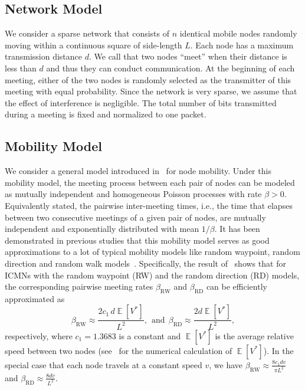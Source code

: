 \documentclass[twocolumn, 10pt]{svjour3}         \smartqed  \usepackage{graphicx}
\DeclareMathOperator*{\E}{\mathbb{E}}
\begin{document}
\subsection{Network Model}

We consider a  sparse network that consists of $n$ identical mobile nodes randomly moving within a continuous square of side-length $L$.
Each node has a maximum transmission distance $d$.
We call that two nodes ``meet'' when their distance is less than $d$ and thus they can conduct communication.
At the beginning of each meeting, either of the two nodes is randomly selected  as the transmitter of this meeting with equal probability.
Since the network is very sparse, we assume that the effect of interference is negligible.
The total number of bits transmitted during a meeting is fixed and normalized to one packet.

\subsection{Mobility Model}

We consider a general  model introduced in~\cite{Groenevelt2005} for node mobility.
Under this mobility model, the meeting process between each pair of nodes can be modeled as mutually independent and  homogeneous Poisson processes with rate $\beta > 0$.
Equivalently stated, the pairwise inter-meeting times, i.e., the time that elapses between two consecutive meetings of a given pair of nodes,  are mutually independent and exponentially distributed with  mean $1/\beta$.
It has been demonstrated in previous studies that this mobility model serves as good approximations to  a lot of typical mobility models like random waypoint, random direction and random walk models~\cite{Groenevelt2005,AlHanbali2008,Zhang2007}.
Specifically, the result of~\cite{Groenevelt2005} shows that for ICMNs with the  random waypoint  (RW) and the random direction (RD) models, the corresponding pairwise meeting rates $\beta_\text{RW}$ and $\beta_\text{RD}$ can be efficiently approximated as
\begin{equation}\label{eqn:beta_estimate}
	\beta_{\text{RW}} \approx \frac{ 2 c_1 \, d \E[V^*]}{L^2},~~\mbox{and}~~
	\beta_\text{RD} \approx \frac{2 d \E[V^*]}{L^2},
\end{equation}
respectively, where $c_1 = 1.3683$ is a constant and  $\E[V^*]$ is the average relative speed between two nodes (see~\cite{Groenevelt2005a} for the numerical calculation of $\E[V^*]$). In the special case that each node travels at a constant speed  $v$, we have $\beta_{\text{RW}} \approx \frac{8 c_1 d v}{\pi L^2}$ and $\beta_\text{RD} \approx \frac{8 d v}{L^2} $.
\end{document}
